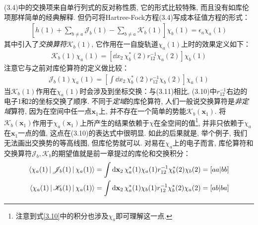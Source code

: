 (3.4)中的交换项来自单行列式的反对称性质, 它的形式比较特殊, 而且没有如库伦项那样简单的经典解释. 但仍可将Hartree-Fock方程(3.4)写成本征值方程的形式：
\begin{align}
\left[ h(1) + \sum_{b\neq a}\mathscr{J}_b(1) - \sum_{b\neq a}\mathscr{K}_b(1)   \right]\chi_b(1) = \epsilon_a\chi_a(1)
\end{align}
其中引入了\emph{交换算符}$\mathscr{K}_b(1)$, 它作用在一自旋轨道$\chi_a(1)$上时的效果定义如下：
\begin{align}
\label{3.10}
\mathscr{K}_b(1)\chi_a(1) = \left[ \dd{x}_2\,\chi_b^*(2)r_{12}^{-1}\chi_a(2) \right]\chi_b(1)
\end{align}
注意它与之前对库伦算符的定义做比较：
\begin{align}
\label{3.11}
\mathscr{J}_b(1)\chi_a(1) = \left[ \int\dd{x}_2\,\chi_b^*(2)r_{12}^{-1}\chi_b(2) \right]\chi_a(1)
\end{align}
当$\mathscr{K}_b(1)$作用在$\chi_a(1)$时会涉及到坐标交换：与(3.11)相比, (3.10)中$r_{12}^{-1}$右边的电子1和2的坐标交换了顺序. 不同于\emph{定域}的库伦算符, 人们一般说交换算符是\emph{非定域}算符, 因为在空间中任一点$\mathbf{x}_1$上, 并不存在一个简单的势能$\mathscr{K}_b(\mathbf{x}_1)$. 将$\mathscr{K}_b(\mathbf{x}_1)$作用于$\chi_a(\mathbf{x}_1)$上所产生的结果依赖于$\chi$在全空间的值\footnote{
注意到式\eqref{3.10}中的积分也涉及$\chi_a$即可理解这一点.
}, 并非只依赖于$\chi_a$在$\mathbf{x}_1$一点的值, 这点在(3.10)的表达式中很明显. 如此的后果就是, 举个例子, 我们无法画出交换势的等高线图, 但库伦势就可以. 对易在$\chi_a$上的电子而言, 库伦算符和交换算符$\mathscr{J}_b,\mathscr{K}_b$的期望值就是前一章提过的库伦和交换积分：
\begin{align}
\braket{\chi_a(1)|\mathscr{J}_b(1)|\chi_a(1)} & = \int\dd{x}_2\,\chi_a^*(1)\chi_a(1)r_{12}^{-1}\chi_b^*(2)\chi_b(2) = [aa|bb]\\
\braket{\chi_a(1)|\mathscr{K}_b(1)|\chi_a(1)} & = \int\dd{x}_2\,\chi_a^*(1)\chi_b(1)r_{12}^{-1}\chi_b^*(2)\chi_a(2) = [ab|ba]
\end{align}

